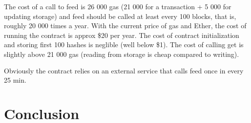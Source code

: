 \documentclass[a4paper]{article}
\begin{document}
    The cost of a call to feed is 26 000 gas (21 000 for a transaction + 5 000 for updating storage) and feed should
    be called at least every 100 blocks, that is, roughly 20 000 times a year. With the current price of gas
    and Ether, the cost of running the contract is approx \$20 per year. The cost of contract initialization and
    storing first 100 hashes is neglible (well below \$1). The cost of calling get is slightly above 21 000 gas
    (reading from storage is cheap compared to writing).

    Obviously the contract relies on an external service that calls feed once in every 25 min.

\section{Conclusion}
\end{document}
